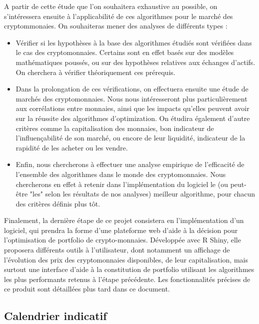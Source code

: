 \documentclass[a4paper]{article}
\begin{document}
A partir de cette étude que l'on souhaitera exhaustive au possible, on s'intéressera ensuite à l'applicabilité de ces algorithmes pour le marché des cryptommonaies. On souhaiteras mener des analyses de différents types :
\begin{itemize}
    \item Vérifier si les hypothèses à la base des algorithmes étudiés sont vérifiées dans le cas des cryptomonnaies. Certains sont en effet basés sur des modèles mathématiques poussés, ou sur des hypothèses relatives aux échanges d'actifs. On cherchera à vérifier théoriquement ces prérequis.
    \item Dans la prolongation de ces vérifications, on effectuera ensuite une étude de marchés des cryptomonnaies. Nous nous intéresseront plus particulièrement aux corrélations entre monnaies, ainsi que les impacts qu'elles peuvent avoir sur la réussite des algorithmes d'optimization. On étudira également d'autre critères comme la capitalisation des monnaies, bon indicateur de l'influençabilité de son marché, ou encore de leur liquidité, indicateur de la rapidité de les acheter ou les vendre.
    \item Enfin, nous chercherons à effectuer une analyse empirique de l'efficacité de l'ensemble des algorithmes dans le monde des cryptomonnaies. Nous chercherons en effet à retenir dans l'implémentation du logiciel le (ou peut-être "les" selon les résultats de nos analyses) meilleur algorithme, pour chacun des critères définis plus tôt.
\end{itemize}\medskip

Finalement, la dernière étape de ce projet consistera en l'implémentation d'un logiciel, qui prendra la forme d’une plateforme web d’aide à la décision pour l’optimisation de portfolio de crypto-monnaies. Développée avec R Shiny, elle proposera différents outils à l'utilisateur, dont notamment un affichage de l'évolution des prix des cryptomonnaies disponibles, de leur capitalisation, mais surtout une interface d'aide à la constitution de portfolio utilisant les algorithmes les plus performants retenus à l'étape précédente. Les fonctionnalités précises de ce produit sont détaillées plus tard dans ce document.

\subsection{Calendrier indicatif}
\end{document}
